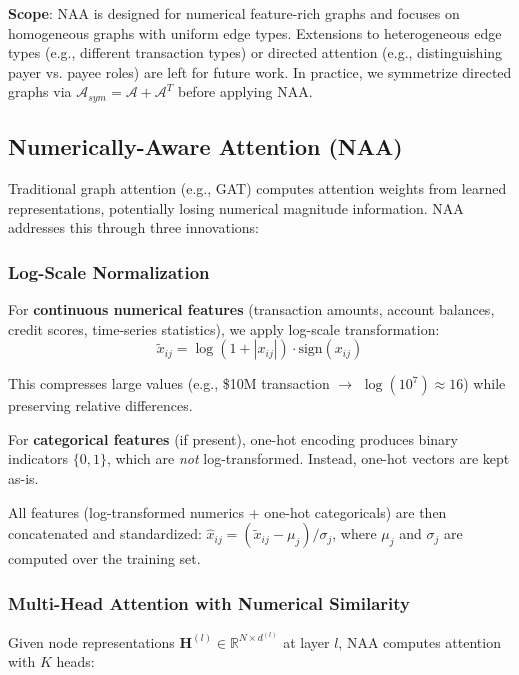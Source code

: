 \textbf{Scope}: NAA is designed for numerical feature-rich graphs and focuses on homogeneous graphs with uniform edge types. Extensions to heterogeneous edge types (e.g., different transaction types) or directed attention (e.g., distinguishing payer vs. payee roles) are left for future work. In practice, we symmetrize directed graphs via $\mathcal{A}_{sym} = \mathcal{A} + \mathcal{A}^T$ before applying NAA.

\subsection{Numerically-Aware Attention (NAA)}

Traditional graph attention (e.g., GAT) computes attention weights from learned representations, potentially losing numerical magnitude information. NAA addresses this through three innovations:

\subsubsection{Log-Scale Normalization}

For \textbf{continuous numerical features} (transaction amounts, account balances, credit scores, time-series statistics), we apply log-scale transformation:
\begin{equation}
\tilde{x}_{ij} = \log(1 + |x_{ij}|) \cdot \text{sign}(x_{ij})
\end{equation}

This compresses large values (e.g., \$10M transaction $\rightarrow$ $\log(10^7) \approx 16$) while preserving relative differences.

For \textbf{categorical features} (if present), one-hot encoding produces binary indicators $\{0,1\}$, which are \textit{not} log-transformed. Instead, one-hot vectors are kept as-is.

All features (log-transformed numerics + one-hot categoricals) are then concatenated and standardized: $\hat{x}_{ij} = (\tilde{x}_{ij} - \mu_j) / \sigma_j$, where $\mu_j$ and $\sigma_j$ are computed over the training set.

\subsubsection{Multi-Head Attention with Numerical Similarity}

Given node representations $\mathbf{H}^{(l)} \in \mathbb{R}^{N \times d^{(l)}}$ at layer $l$, NAA computes attention with $K$ heads:

